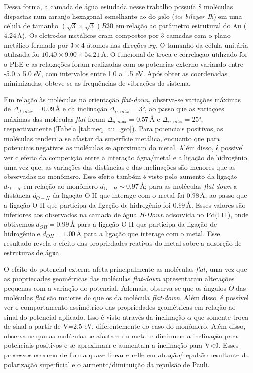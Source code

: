 Dessa forma, a camada de água estudada nesse trabalho possuía 8 moléculas dispostas num arranjo hexagonal semelhante ao do gelo (\textit{ice bilayer Ih}) em uma célula de tamanho $ (\sqrt{3}\times\sqrt{3})R30 $ em relação ao parâmetro estrutural do Au ($ 4.24\,\si{\angstrom} $). Os eletrodos metálicos eram compostos por 3 camadas com o plano metálico formado por $ 3\times 4$ átomos nas direções $ xy $. O tamanho da célula unitária utilizada foi $ 10.40\times9.00\times 54.21\,\si{\angstrom} $. O funcional de troca e correlação utilizado foi o PBE e as relaxações foram realizadas com os potencias externo variando entre -5.0 a 5.0 eV, com intervalos entre 1.0 a 1.5 eV. Após obter as coordenadas minimizadas, obteve-se as frequências de vibrações do sistema.

Em relação às moléculas na orientação \textit{flat-down}, observa-se variações máximas de $\Delta_{d,máx}= 0.09\,\si{\angstrom} $ e da inclinação $\Delta_{\alpha,máx}= 3\si{\degree} $, ao passo que as variações máximas das moléculas \textit{flat} foram $\Delta_{d,máx}= 0.57\,\si{\angstrom} $ e $\Delta_{\alpha,máx}= 25\si{\degree} $, respectivamente (Tabela \ref{tab:neq_au_geo}). Para potenciais positivos, as moléculas tendem a se afastar da superfície metálica, enquanto que para potenciais negativos as moléculas se aproximam do metal. Além disso, é possível ver o efeito da competição entre a interação água/metal e a ligação de hidrogênio, uma vez que, as variações das distâncias e das inclinações são menores que as observadas no monômero. Esse efeito também é visto pelo aumento da ligação $ d_{O-H} $ em relação ao monômero $ d_{O-H}\sim0.97\,\si{\angstrom} $; para as moléculas \textit{flat-down} a distância $ d_{O-H} $ da ligação O-H que interage com o metal foi $ 0.98\,\si{\angstrom}  $, ao passo que a ligação O-H que participa da ligação de hidrogênio foi $ 0.99\,\si{\angstrom}  $. Esses valores são inferiores aos observados na camada de água \textit{H-Down} adsorvida no Pd(111), onde obtivemos $ d_{OH}=0.99\,\si{\angstrom} $ para a ligação O-H que participa da ligação de hidrogênio e $ d_{OH}=1.00\,\si{\angstrom} $ para a ligação que interage com o metal. Esse resultado revela o efeito das propriedades reativas do metal sobre a adsorção de estruturas de água.

O efeito do potencial externo afeta principalmente as moléculas \textit{flat}, uma vez que as propriedades geométricas das moléculas \textit{flat-down} apresentaram alterações pequenas com a variação do potencial. Ademais, observa-se que os ângulos $ \Theta $ das moléculas \textit{flat} são maiores do que os da molécula \textit{flat-down}. Além disso, é possível ver o comportamento assimétrico das propriedades geométricas em relação ao sinal do potencial aplicado. Isso é visto através da inclinação $ \alpha $ que somente troca de sinal a partir de V=2.5 eV, diferentemente do caso do monômero. Além disso, observa-se que as moléculas se afastam do metal e diminuem a inclinação para potenciais positivos e se aproximam e aumentam a inclinação para V<0. Esses processos ocorrem de forma quase linear e refletem atração/repulsão resultante da polarização superficial e o aumento/diminuição da repulsão de Pauli.

